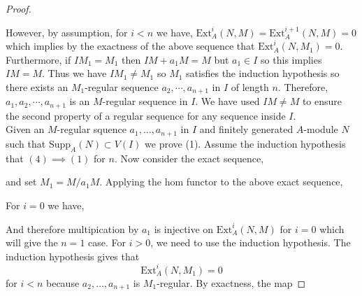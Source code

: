 \documentclass[12pt]{article}
\newcommand{\Ext}[4]{\mathrm{Ext}^{#1}_{#2} \left( #3, #4 \right)}
\newcommand{\Homover}[3]{\mathrm{Hom}_{#1} \left( #2, #3 \right)}
\newcommand{\Supp}[2]{\mathrm{Supp}_{#1}\left( #2 \right)}
\theoremstyle{remark}
\theoremstyle{definition}
\begin{document}
\begin{proof}
\begin{center}
\end{center}
However, by assumption, for $i < n$ we have, $\Ext{i}{A}{N}{M} = \Ext{i+1}{A}{N}{M} = 0$ which implies by the exactness of the above sequence that $\Ext{i}{A}{N}{M_1} = 0$. Furthermore, if $I M_1 = M_1$ then $I M + a_1 M = M$ but $a_1 \in I$ so this implies $I M = M$. Thus we have $I M_1 \neq M_1$ so $M_1$ satisfies the induction hypothesis so there exists an $M_1$-regular sequence $a_2, \cdots, a_{n+1}$ in $I$ of length $n$. Therefore, $a_1, a_2, \cdots, a_{n+1}$ is   
an $M$-regular sequence in $I$. We have used $IM \neq M$ to ensure the second property of a regular sequence for any sequence inside $I$. 
\bigskip\\
Given an $M$-regular squence $a_1, \dots, a_{n+1}$ in $I$ and finitely generated $A$-module $N$ such that $\Supp{A}{N} \subset V(I)$ we prove (1). Assume the induction hypothesis  that $(4) \implies (1)$ for $n$. Now consider the exact sequence,
\begin{center}
\end{center}
and set $M_1 = M / a_1 M$. Applying the hom functor to the above exact sequence,
\begin{center}
\end{center}
For $i = 0$ we have,
\begin{center}
\end{center}
And therefore multipication by $a_1$ is injective on $\Ext{i}{A}{N}{M}$ for $i = 0$ which will give the $n = 1$ case. For $i > 0$, we need to use the induction hypothesis. The induction hypothesis gives that
\[ \Ext{i}{A}{N}{M_1} = 0 \]
for $i < n$ because $a_2, \dots, a_{n+1}$ is $M_1$-regular. By exactness, the map

\end{proof}
\end{document}
